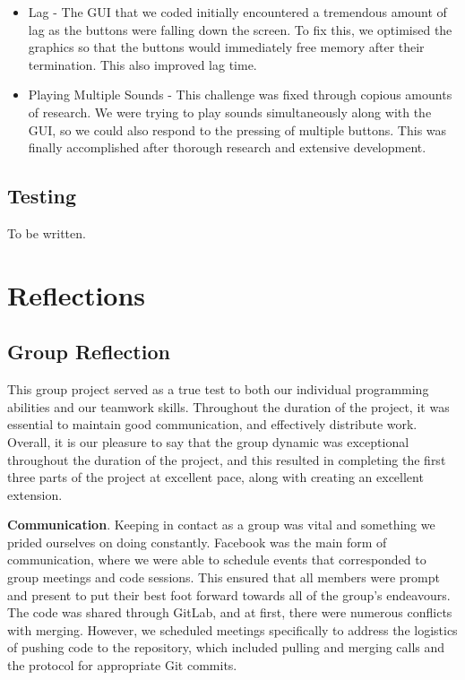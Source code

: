 \documentclass[11pt]{article}
\begin{document}
\begin{itemize}

\item Lag - The GUI that we coded initially encountered a tremendous amount of lag as the buttons were falling down the screen. To fix this, we optimised the graphics so that the buttons would immediately free memory after their termination. This also improved lag time.

\item Playing Multiple Sounds - This challenge was fixed through copious amounts of research. We were trying to play sounds simultaneously along with the GUI, so we could also respond to the pressing of multiple buttons. This was finally accomplished after thorough research and extensive development.

\end{itemize}

\subsection{Testing}

To be written.

\section{Reflections}

\subsection{Group Reflection}

This group project served as a true test to both our individual programming abilities and our teamwork skills. Throughout the duration of the project, it was essential to maintain good communication, and effectively distribute work. Overall, it is our pleasure to say that the group dynamic was exceptional throughout the duration of the project, and this resulted in completing the first three parts of the project at excellent pace, along with creating an excellent extension.

\vspace{0.2in}

\textbf{Communication}. Keeping in contact as a group was vital and something we prided ourselves on doing constantly. Facebook was the main form of communication, where we were able to schedule events that corresponded to group meetings and code sessions. This ensured that all members were prompt and present to put their best foot forward towards all of the group's endeavours. The code was shared through GitLab, and at first, there were numerous conflicts with merging. However, we scheduled meetings specifically to address the logistics of pushing code to the repository, which included pulling and merging calls and the protocol for appropriate Git commits.
\end{document}
